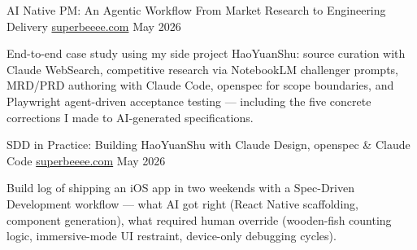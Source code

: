 
\begin{cventries}

\cventry
  {AI Native PM: An Agentic Workflow From Market Research to Engineering Delivery}
  {\href{https://www.superbeeee.com/post/2026/05/haoyuanshu-v2-pm-ai-workflow/}{superbeeee.com}}
  {}
  {May 2026}
  {
    \begin{cvitems}
      \item {End-to-end case study using my side project HaoYuanShu: source curation with Claude WebSearch, competitive research via NotebookLM challenger prompts, MRD/PRD authoring with Claude Code, openspec for scope boundaries, and Playwright agent-driven acceptance testing — including the five concrete corrections I made to AI-generated specifications.}
    \end{cvitems}
  }

  \vspace{1mm}

\cventry
  {SDD in Practice: Building HaoYuanShu with Claude Design, openspec \& Claude Code}
  {\href{https://www.superbeeee.com/post/2026/05/haoyuanshu-build-with-claude-and-openspec/}{superbeeee.com}}
  {}
  {May 2026}
  {
    \begin{cvitems}
      \item {Build log of shipping an iOS app in two weekends with a Spec-Driven Development workflow — what AI got right (React Native scaffolding, component generation), what required human override (wooden-fish counting logic, immersive-mode UI restraint, device-only debugging cycles).}
    \end{cvitems}
  }

\end{cventries}
